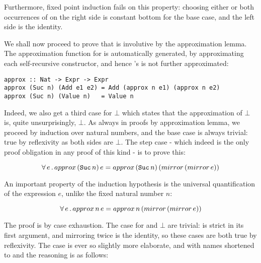 Furthermore, fixed point induction fails on this property: choosing
either or both occurrences of  on the right side is
constant bottom for the base case, and the left side is the identity.


We shall now proceed to prove that  is involutive by the
approximation lemma. The approximation function for  is
automatically generated, by approximating each self-recursive
constructor, and hence 's  is not further approximated:

\begin{verbatim}
approx :: Nat -> Expr -> Expr
approx (Suc n) (Add e1 e2) = Add (approx n e1) (approx n e2)
approx (Suc n) (Value n)   = Value n
\end{verbatim}

Indeed, we also get a third case for $\bot$ which states that the
approximation of $\bot$ is, quite unsurprisingly, $\bot$.
As always in proofs by approximation lemma, we proceed by induction
over natural numbers, and the base case is always trivial: true by
reflexivity as both sides are $\bot$. The step case - which indeed is
the only proof obligation in any proof of this kind - is to prove
this:

\begin{equation*}
\fa{e}  approx \, (\hs{Suc} \, n) \, e = approx \, (\hs{Suc} \, n) \, (mirror \, (mirror \, e))
\end{equation*}

An important property of the induction hypothesis is the universal
quantification of the expression $e$, unlike the fixed natural number
$n$:

\begin{equation*}
\forall \, e \, . \,  approx \, n \, e = approx \, n \, (mirror \, (mirror \, e))
\end{equation*}

The proof is by case exhaustion. The case for  and $\bot$
are trivial:  is strict in its first argument, and
mirroring  twice is the identity, so these cases are both
true by reflexivity. The  case is ever so slightly more
elaborate, and with names shortened to  and  the
reasoning is as follows:

